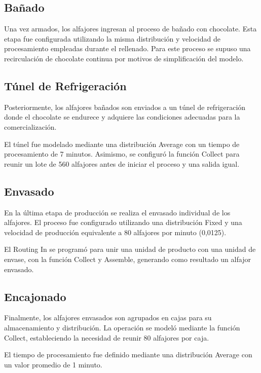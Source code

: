 \documentclass[runningheads]{llncs}
\begin{document}
\subsection{Bañado}

Una vez armados, los alfajores ingresan al proceso de bañado con chocolate. Esta etapa fue configurada utilizando la misma distribución y velocidad de procesamiento empleadas durante el rellenado. Para este proceso se supuso una recirculación de chocolate continua por motivos de simplificación del modelo.

\subsection{Túnel de Refrigeración}

Posteriormente, los alfajores bañados son enviados a un túnel de refrigeración donde el chocolate se endurece y adquiere las condiciones adecuadas para la comercialización. 

El túnel fue modelado mediante una distribución Average con un tiempo de procesamiento de 7 minutos. Asimismo, se configuró la función Collect para reunir un lote de 560 alfajores antes de iniciar el proceso y una salida igual.

\subsection{Envasado}

En la última etapa de producción se realiza el envasado individual de los alfajores. El proceso fue configurado utilizando una distribución Fixed y una velocidad de producción equivalente a 80 alfajores por minuto (0,0125).

El Routing In se programó para unir una unidad de producto con una unidad de envase, con la función Collect y Assemble,  generando como resultado un alfajor envasado.

\subsection{Encajonado}

Finalmente, los alfajores envasados son agrupados en cajas para su almacenamiento y distribución. La operación se modeló mediante la función Collect, estableciendo la necesidad de reunir 80 alfajores por caja.

El tiempo de procesamiento fue definido mediante una distribución Average con un valor promedio de 1 minuto.
\end{document}
